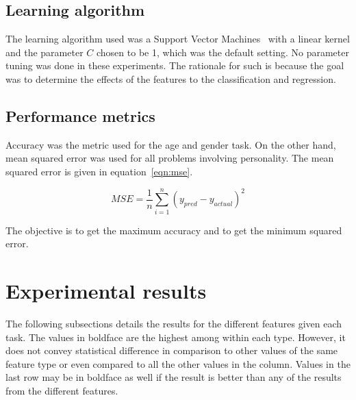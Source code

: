 \documentclass[a4paper]{llncs}
\begin{document}
\subsection{Learning algorithm}
The learning algorithm used was a Support Vector Machines~\cite{cortes1995support} with a linear kernel and the parameter $C$ chosen to be 1, which was the default setting. No parameter tuning was done in these experiments. The rationale for such is because the goal was to determine the effects of the features to the classification and regression.  
\subsection{Performance metrics}
Accuracy was the metric used for the age and gender task. On the other hand, mean squared error was used for all problems involving personality. The mean squared error is given in equation~\ref{eqn:mse}.

\begin{equation}
  MSE =\frac{1}{n} \sum_{i=1}^n \left( y_{pred}-y_{actual}\right)^2 
  \label{eqn:mse}
\end{equation}


The objective is to get the maximum accuracy and to get the minimum squared error. 
\section{Experimental results}
The following subsections details the results for the different features given each task. The values in boldface are the highest among within each type. However, it does not convey statistical difference in comparison to other values of the same feature type or even compared to all the other values in the column. Values in the last row may be in boldface as well if the result is better than any of the results from the different features. 
\end{document}
